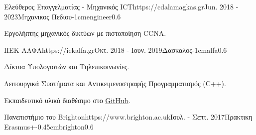 \documentclass{mycv}
\begin{document}
	\vspace*{0.5cm}

	\begin{EntryDatedLogo}{Ελεύθερος Επαγγελματίας - Μηχανικός ICT}{https://cdalamagkas.gr}{Jun. 2018 - 2023}{Μηχανικος Πεδιου}{-1cm}{engineer}{0.6}
		\begin{Itemize}
			\item Εργολήπτης μηχανικός δικτύων με πιστοποίηση CCNA.
		\end{Itemize}
	\end{EntryDatedLogo}

	\vspace*{0.5cm}	

	
	\vspace*{0.5cm}
	
	\begin{EntryDatedLogo}{ΙΙΕΚ ΑΛΦΑ}{https://iekalfa.gr}{Οκτ. 2018 - Ιουν. 2019}{Δασκαλος}{-1cm}{alfa}{0.6}
		\begin{Itemize}
			\item Δίκτυα Υπολογιστών και Τηλεπικοινωνίες.
			\item Λειτουργικά Συστήματα και Αντικειμενοστραφής Προγραμματισμός (C++).
			\item Εκπαιδευτικό υλικό διαθέσιμο στο \href{https://github.com/cdalamagkas/cs-lectures-gr}{GitHub}.
		\end{Itemize}
	\end{EntryDatedLogo}

	\vspace*{0.5cm}
		
	\begin{EntryDatedLogo}{Πανεπιστήμιο του Brighton}{https://www.brighton.ac.uk}{Ιουλ. - Σεπτ. 2017}{Πρακτικη Erasmus+}{-0.45cm}{brighton}{0.6}
	\end{EntryDatedLogo}
\end{document}
